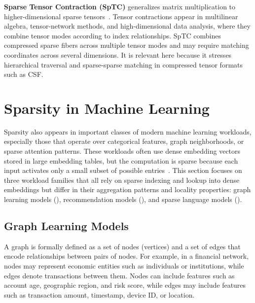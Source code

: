 \noindent\textbf{Sparse Tensor Contraction (SpTC)} generalizes matrix multiplication to higher-dimensional sparse tensors~\cite{liu2021sparta}. Tensor contractions appear in multilinear algebra, tensor-network methods, and high-dimensional data analysis, where they combine tensor modes according to index relationships. SpTC combines compressed sparse fibers across multiple tensor modes and may require matching coordinates across several dimensions. It is relevant here because it stresses hierarchical traversal and sparse-sparse matching in compressed tensor formats such as CSF.


\section{Sparsity in Machine Learning} \label{sec:sparsity-in-machine-learning} %

Sparsity also appears in important classes of modern machine learning workloads, especially those that operate over categorical features, graph neighborhoods, or sparse attention patterns. These workloads often use dense embedding vectors stored in large embedding tables, but the computation is sparse because each input activates only a small subset of possible entries~\cite{naumov2019arxiv,pennington2014emnlp,ke2020isca,zaheer2020neurips,hu2020neurips}. This section focuses on three workload families that all rely on sparse indexing and lookup into dense embeddings but differ in their aggregation patterns and locality properties: graph learning models (), recommendation models (), and sparse language models ().

\subsection{Graph Learning Models} \label{sec:background-graph-learning} %

A graph is formally defined as a set of nodes (vertices) and a set of edges that encode relationships between pairs of nodes. For example, in a financial network, nodes may represent economic entities such as individuals or institutions, while edges denote transactions between them. Nodes can include features such as account age, geographic region, and risk score, while edges may include features such as transaction amount, timestamp, device ID, or location.


